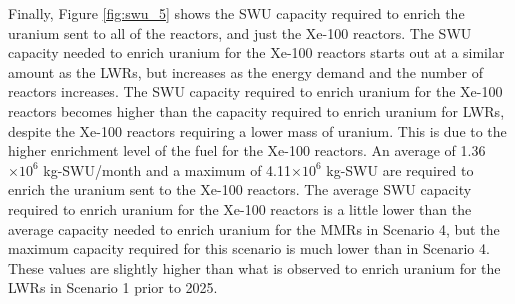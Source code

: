 Finally, Figure \ref{fig:swu_5} shows the \gls{SWU} capacity required
to enrich the uranium sent to all of the reactors, and just the Xe-100
reactors. The \gls{SWU} capacity needed 
to enrich uranium for the Xe-100 reactors starts out at a similar 
amount as the \glspl{LWR}, but 
increases as the energy demand and the number of reactors increases. 
The \gls{SWU} capacity required to enrich uranium 
for the Xe-100 reactors becomes higher than the capacity 
required to enrich uranium for \glspl{LWR}, despite the Xe-100 
reactors requiring a lower mass of uranium. This is due to the higher 
enrichment level of the fuel for the Xe-100 reactors. An average of 
1.36$\times 10^6$ kg-\gls{SWU}/month and a maximum of 
4.11$\times 10^6$ kg-\gls{SWU} are required to enrich the uranium sent 
to the Xe-100 reactors. The average \gls{SWU} capacity 
required to enrich uranium for the Xe-100 reactors is a little lower 
than the average capacity needed to enrich uranium for the \glspl{MMR}
in Scenario 4, but the maximum capacity required for this scenario is much 
lower than in Scenario 4. These values are slightly higher 
than what is observed to enrich uranium for the \glspl{LWR} in Scenario 1
prior to 2025.

